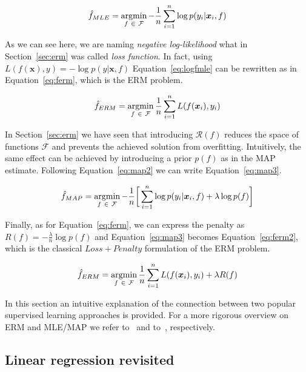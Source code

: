 \begin{equation} \label{eq:logfmle}
	\hat f_{MLE} = \mathop{\mathrm{argmin}}\limits_{f~\in~\mathcal{F}} - \frac{1}{n} \sum_{i=1}^n \log p(y_i|\bm{x}_i,f)
\end{equation}

As we can see here, we are naming \textit{negative log-likelihood} what in Section~\ref{sec:erm} was called \textit{loss function}. In fact, using $L(f(\bm{x}), y) = -\log p(y|\bm{x}, f)$ Equation~\eqref{eq:logfmle} can be rewritten as in Equation~\eqref{eq:ferm}, which is the ERM problem.

\begin{equation} \label{eq:ferm}
	\hat f_{ERM} = \mathop{\mathrm{argmin}}\limits_{f~\in~\mathcal{F}} \frac{1}{n} \sum_{i=1}^n L(f(\bm{x}_i), y_i)
\end{equation}

In Section~\ref{sec:erm} we have seen that introducing $\mathcal{R}(f)$ reduces the space of functions $\mathcal{F}$ and prevents the achieved solution from overfitting. Intuitively, the same effect can be achieved by introducing a prior $p(f)$ as in the MAP estimate. Following Equation~\eqref{eq:map2} we can write Equation~\eqref{eq:map3}.

\begin{equation} \label{eq:map3}
	\hat f_{MAP} = \mathop{\mathrm{argmin}}\limits_{f~\in~\mathcal{F}} - \frac{1}{n} \bigg[ \sum_{i=1}^n \log p(y_i|\bm{x}_i,f) + \lambda \log p(f) \bigg]
\end{equation}

Finally, as for Equation~\eqref{eq:ferm}, we can express the penalty as $R(f) = - \frac{\lambda}{n} \log p(f)$ and Equation~\eqref{eq:map3} becomes Equation~\eqref{eq:ferm2}, which is the classical $Loss + Penalty$ formulation of the ERM problem.

\begin{equation} \label{eq:ferm2}
	\hat f_{ERM} = \mathop{\mathrm{argmin}}\limits_{f~\in~\mathcal{F}} \frac{1}{n} \sum_{i=1}^n L(f(\bm{x}_i), y_i) + \lambda R(f)
\end{equation}

In this section an intuitive explanation of the connection between two popular supervised learning approaches is provided. For a more rigorous overview on ERM and MLE/MAP we refer to~\cite{hastie2009elements} and to~\cite{rasmussen2006gaussian}, respectively.

\subsection{Linear regression revisited} \label{subsec:linear_regression_revisited}

